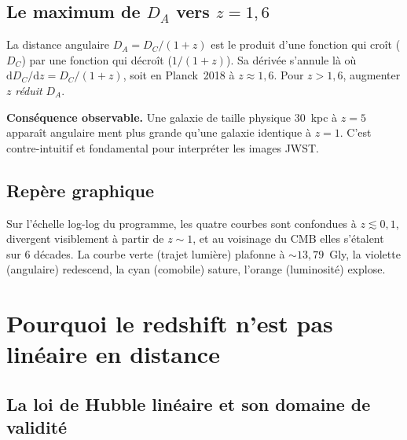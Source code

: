\documentclass[11pt,a4paper,openany]{report}
\newcommand{\dif}{\mathrm{d}}
\begin{document}
\section{Le maximum de $D_{A}$ vers $z = 1{,}6$}

\begin{tcolorbox}[approfondir]
La distance angulaire $D_A = D_{C}/(1+z)$ est le produit d'une fonction qui
croît ($D_{C}$) par une fonction qui décroît ($1/(1+z)$). Sa dérivée
s'annule là où $\dif D_C / \dif z = D_C/(1+z)$, soit en Planck~2018 à $z
\approx 1{,}6$. Pour $z > 1{,}6$, augmenter $z$ \emph{réduit} $D_A$.

\medskip
\textbf{Conséquence observable.} Une galaxie de taille physique $30$~kpc à
$z = 5$ apparaît angulaire ment plus grande qu'une galaxie identique à
$z = 1$. C'est contre-intuitif et fondamental pour interpréter les images
JWST.
\end{tcolorbox}

\section{Repère graphique}

Sur l'échelle log-log du programme, les quatre courbes sont confondues à
$z \lesssim 0{,}1$, divergent visiblement à partir de $z \sim 1$, et au
voisinage du CMB elles s'étalent sur 6 décades. La courbe verte (trajet
lumière) plafonne à $\sim 13{,}79$~Gly, la violette (angulaire) redescend, la
cyan (comobile) sature, l'orange (luminosité) explose.

\chapter{Pourquoi le redshift n'est pas linéaire en distance}
\label{chap:nonlinear}

\section{La loi de Hubble linéaire et son domaine de validité}
\end{document}
